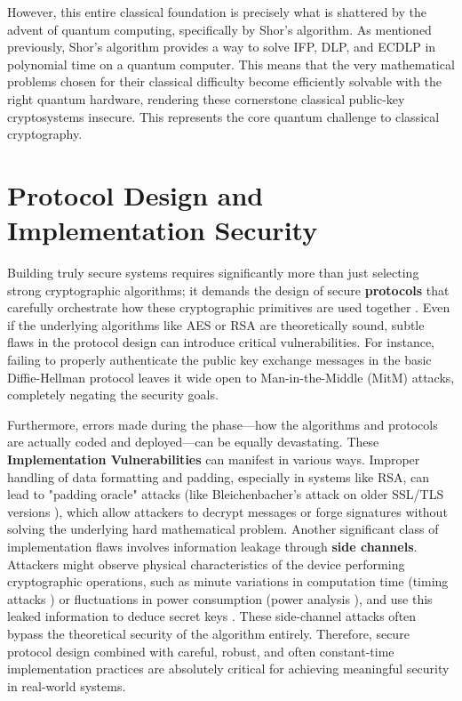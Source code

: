 However, this entire classical foundation is precisely what is shattered by the advent of quantum computing, specifically by Shor's algorithm. As mentioned previously, Shor's algorithm provides a way to solve IFP, DLP, and ECDLP in polynomial time on a quantum computer. This means that the very mathematical problems chosen for their classical difficulty become efficiently solvable with the right quantum hardware, rendering these cornerstone classical public-key cryptosystems insecure. This represents the core quantum challenge to classical cryptography.

\section{Protocol Design and Implementation Security}\label{sec:protocol_design_ch3}

Building truly secure systems requires significantly more than just selecting strong cryptographic algorithms; it demands the design of secure \textbf{protocols} that carefully orchestrate how these cryptographic primitives are used together \parencite{stallings2017cryptography}. Even if the underlying algorithms like AES or RSA are theoretically sound, subtle flaws in the protocol design can introduce critical vulnerabilities. For instance, failing to properly authenticate the public key exchange messages in the basic Diffie-Hellman protocol leaves it wide open to Man-in-the-Middle (MitM) attacks, completely negating the security goals.

Furthermore, errors made during the  phase—how the algorithms and protocols are actually coded and deployed—can be equally devastating. These \textbf{Implementation Vulnerabilities} can manifest in various ways. Improper handling of data formatting and padding, especially in systems like RSA, can lead to "padding oracle" attacks (like Bleichenbacher's attack on older SSL/TLS versions \parencite{bleichenbacher1998chosen}), which allow attackers to decrypt messages or forge signatures without solving the underlying hard mathematical problem. Another significant class of implementation flaws involves information leakage through \textbf{side channels}. Attackers might observe physical characteristics of the device performing cryptographic operations, such as minute variations in computation time (timing attacks \parencite{kocher1996timing}) or fluctuations in power consumption (power analysis \parencite{mangard2007power}), and use this leaked information to deduce secret keys \parencite{boneh2020graduate}. These side-channel attacks often bypass the theoretical security of the algorithm entirely. Therefore, secure protocol design combined with careful, robust, and often constant-time implementation practices are absolutely critical for achieving meaningful security in real-world systems.

